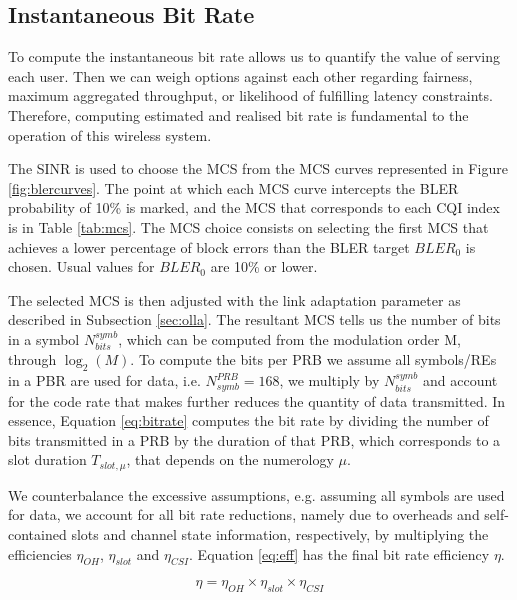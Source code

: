 \subsection{Instantaneous Bit Rate}

To compute the instantaneous bit rate allows us to quantify the value of serving each user. Then we can weigh options against each other regarding fairness, maximum aggregated throughput, or likelihood of fulfilling latency constraints. Therefore, computing estimated and realised bit rate is fundamental to the operation of this wireless system.

The SINR is used to choose the MCS from the MCS curves represented in Figure \ref{fig:blercurves}. The point at which each MCS curve intercepts the BLER probability of 10\% is marked, and the MCS that corresponds to each CQI index is in Table \ref{tab:mcs}. The MCS choice consists on selecting the first MCS that achieves a lower percentage of block errors than the \ac{BLER} target $BLER_0$ is chosen. Usual values for $BLER_0$ are 10\% or lower. 




The selected MCS is then adjusted with the link adaptation parameter as described in Subsection \ref{sec:olla}. The resultant MCS tells us the number of bits in a symbol $N_{bits}^{symb}$, which can be computed from the modulation order M, through $\log_2(M)$. To compute the bits per PRB we assume all symbols/REs in a PBR are used for data, i.e. $N_{symb}^{PRB} = 168$, we multiply by $N_{bits}^{symb}$ and account for the code rate that makes further reduces the quantity of data transmitted. In essence, Equation \eqref{eq:bitrate} computes the bit rate by dividing the number of bits transmitted in a PRB by the duration of that PRB, which corresponds to a slot duration $T_{slot, \mu}$, that depends on the numerology $\mu$.

We counterbalance the excessive assumptions, e.g. assuming all symbols are used for data, we account for all bit rate reductions, namely due to overheads and self-contained slots and channel state information, respectively, by multiplying the efficiencies $\eta_{OH}$, $\eta_{slot}$ and $\eta_{CSI}$. Equation \eqref{eq:eff} has the final bit rate efficiency $\eta$.


\begin{equation} \label{eq:eff}
    \eta = \eta_{OH} \times \eta_{slot} \times \eta_{CSI}
\end{equation}


